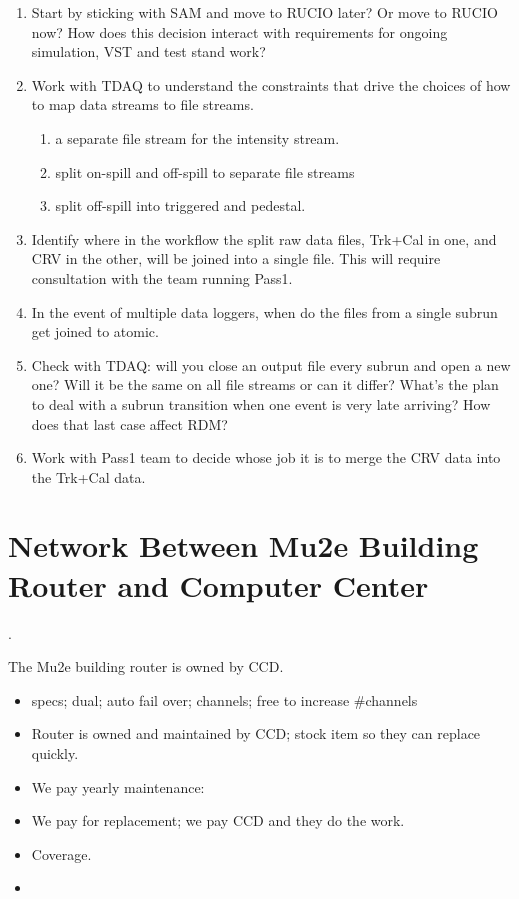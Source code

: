 \begin{enumerate}
\item Start by sticking with SAM and move to RUCIO later?  Or move to RUCIO now?
  How does this decision interact with requirements for ongoing simulation, VST
  and test stand work?
\item Work with TDAQ to understand the constraints that drive the choices of how to
  map data streams to file streams.
  \begin{enumerate}
    \item a separate file stream for the intensity stream.
    \item split on-spill and off-spill to separate file streams
    \item split off-spill into triggered and pedestal.
  \end{enumerate}
\item Identify where in the workflow the split raw data files, Trk+Cal in one,
  and CRV in the other, will be joined into a single file.  This will require consultation with the team running
  Pass1.
\item In the event of multiple data loggers, when do the files from a single subrun get joined to atomic.
\item Check with TDAQ: will you close an output file every subrun and open a new one? Will it be the same
  on all file streams or can it differ?  What's the plan to deal with a subrun transition when one
  event is very late arriving?  How does that last case affect RDM?
\item Work with Pass1 team to decide whose job it is to merge the CRV data into the Trk+Cal data.
\end{enumerate}


\appendix

\chapter{Network Between Mu2e Building Router and Computer Center}
\label{app:RouterAndNetwork}.

The Mu2e building router is owned by CCD.
\begin{itemize}
\item specs; dual; auto fail over; channels; free to increase \#channels
\item Router is owned and maintained by CCD; stock item so they can replace quickly.
\item We pay yearly maintenance: 
\item We pay for replacement; we pay CCD and they do the work. 
\item {} Coverage.
\item {}
\end{itemize}


